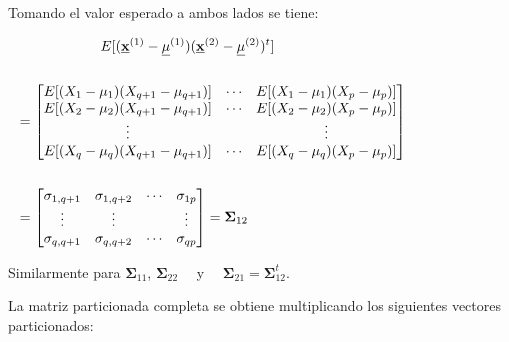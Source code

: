\documentclass[
]{book}
\theoremstyle{definition}
\theoremstyle{definition}
\theoremstyle{definition}
\theoremstyle{definition}
\theoremstyle{remark}
\begin{document}
Tomando el valor esperado a ambos lados se tiene:

\begin{align*}
E[(\underline{\mathbf{x}}^{(1)}-\underline{\mu}^{(1)})(\underline{\mathbf{x}}^{(2)}-\underline{\mu}^{(2)})^t]\\ \\
&\hspace{-6.5cm}=
  \begin{bmatrix}
E[(X_1-\mu_1)(X_{q+1}-\mu_{q+1})] & \cdots & E[(X_1-\mu_1)(X_p-\mu_p)]\\
E[(X_2-\mu_2)(X_{q+1}-\mu_{q+1})] & \cdots & E[(X_2-\mu_2)(X_p-\mu_p)]\\
\vdots & & \vdots \\
E[(X_q-\mu_q)(X_{q+1}-\mu_{q+1})] & \cdots & E[(X_q-\mu_q)(X_p-\mu_p)]
\end{bmatrix}\\ \\
&\hspace{-6.5cm}=\begin{bmatrix}
\sigma_{1,q+1} & \sigma_{1,q+2} &\cdots & \sigma_{1p} \\
\vdots &  \vdots &  &  \vdots \\
\sigma_{q,q+1} & \sigma_{q,q+2} &\cdots & \sigma_{qp}
\end{bmatrix}=\mathbf{\Sigma}_{12}
\end{align*}

Similarmente para \(\mathbf{\Sigma}_{11}\), \(\mathbf{\Sigma}_{22}\)~~ y~~ \(\mathbf{\Sigma}_{21}=\mathbf{\Sigma}_{12}^{t}\).

La matriz particionada completa se obtiene multiplicando los siguientes vectores particionados:
\end{document}
